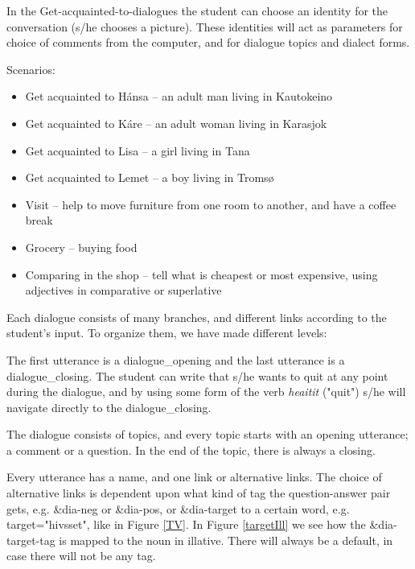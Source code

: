 \documentclass[a4paper,12pt]{article}
\begin{document}
In the Get-acquainted-to-dialogues the student can choose an identity for the conversation (s/he chooses a picture). These identities will act as parameters for choice of comments from the computer, and for dialogue topics and dialect forms.

\vspace{0.5cm}
	
Scenarios:
\begin{itemize}
\item Get acquainted to Hánsa -- an adult man living in Kautokeino
\item Get acquainted to Káre -- an adult woman living in Karasjok
\item Get acquainted to Lisa -- a girl living in Tana
\item Get acquainted to Lemet -- a boy living in Tromsø
\item Visit -- help to move furniture from one room to another, and have a coffee break
\item Grocery -- buying food
\item Comparing in the shop -- tell what is cheapest or most expensive, using adjectives in comparative or superlative
\end{itemize}


Each dialogue consists of many branches, and different links according to the student's input. To organize them, we have made different levels:

The first utterance is a dialogue\_opening and the last utterance is a dialogue\_closing. The student can write that s/he wants to quit at any point during the dialogue, and by using some form of the verb \textit{heaitit} ("quit") s/he will navigate directly to the dialogue\_closing.

The dialogue consists of topics, and every topic starts with an opening utterance; a comment or a question. In the end of the topic, there is always a closing.  

Every utterance has a name, and one link or alternative links. The choice of alternative links is dependent upon what kind of tag the question-answer pair gets, e.g. \&dia-neg or \&dia-pos, or \&dia-target to a certain word, e.g. target="hivsset", like in Figure \ref{TV}.  In Figure \ref{targetIll} we see how the \&dia-target-tag is mapped to the noun in illative. There will always be a default, in case there will not be any tag. \\
\end{document}
